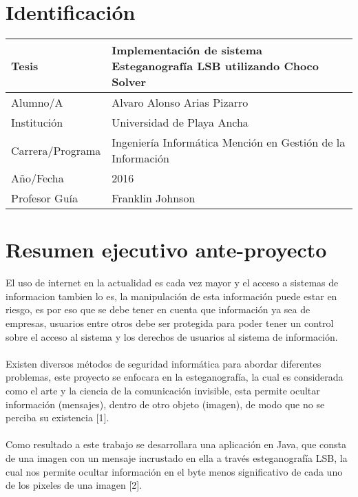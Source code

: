 \documentclass[14pt]{article}
\begin{document}
	\pagestyle{fancy} 

	\section*{Identificación}
		\begin{table}[htb]
			\begin{center}
				\begin{tabular}{|l|l|}
 					\hline
					Tesis & Implementación de sistema Esteganografía LSB utilizando Choco Solver \\ \hline
					Alumno/A & Alvaro Alonso Arias Pizarro\\ \hline
					Institución & Universidad de Playa Ancha \\ \hline
					Carrera/Programa & Ingeniería Informática Mención en Gestión de la Información
					\\ \hline
					Año/Fecha & 2016\\ \hline
					Profesor Guía & Franklin Johnson \\ \hline
				\end{tabular}
			\end{center}
		\end{table}

	\section{Resumen ejecutivo ante-proyecto}
El uso de internet en la actualidad es cada vez mayor y el acceso a sistemas de informacion tambien lo es, la manipulación de esta información puede estar en riesgo, es por eso que se debe tener en cuenta que información ya sea de empresas, usuarios entre otros  debe ser protegida para poder tener un control sobre el acceso al sistema y los derechos de usuarios al sistema de información.
		\\~\\
Existen diversos métodos de seguridad informática para abordar diferentes problemas, este proyecto se enfocara en la esteganografía, la cual es considerada como el arte y la ciencia de la comunicación invisible, esta permite ocultar información (mensajes), dentro de otro objeto (imagen), de modo que no se perciba su existencia [1].
		\\~\\
Como resultado a este trabajo se desarrollara una aplicación en Java, que consta de una imagen con un mensaje incrustado en ella a través esteganografía LSB, la cual nos permite ocultar información en el byte menos significativo de cada uno de los pixeles de una imagen [2].
\end{document}
